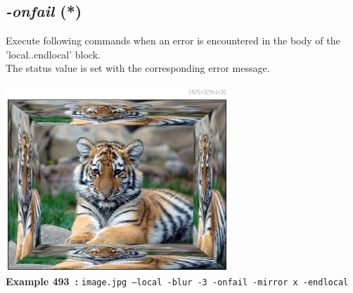 \documentclass[a4paper,11pt,twoside]{book}
\begin{document}
\subsection{\emph{-onfail} (*)}\vspace*{-0.5em}
Execute following commands when an error is encountered in the body of the 'local..endlocal' block.
~\\The status value is set with the corresponding error message.
\begin{center}\includegraphics[keepaspectratio=true,height=7cm,width=\textwidth]{img/gmic_def493.jpg}\\
{\footnotesize \textbf{Example 493~:} \texttt{image.jpg --local -blur -3 -onfail -mirror x -endlocal}}
\end{center}
\end{document}
